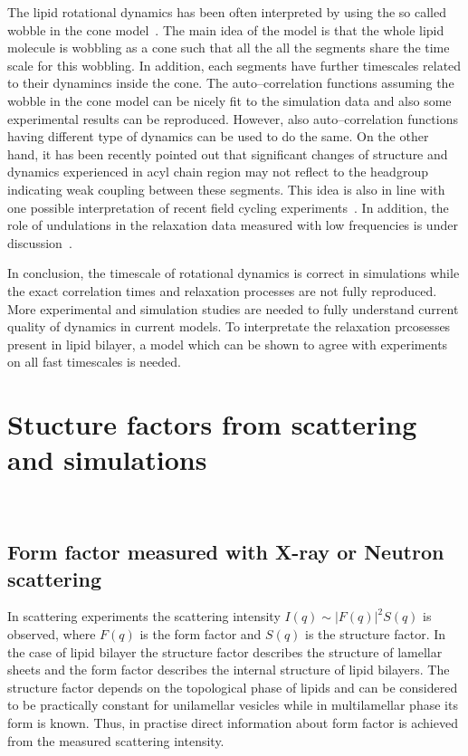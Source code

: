 \documentclass[aps,prl,superscriptaddress,twocolumn]{revtex4}
\begin{document}
The lipid rotational dynamics has been often interpreted by using the so called wobble in the cone model~\cite{pastor88,pastor02,klauda08a,klauda08c,sivanandam09}.
The main idea of the model is that the whole lipid molecule is wobbling as a cone such that all the
all the segments share the time scale for this wobbling. In addition, each segments have further timescales
related to their dynamincs inside the cone. The auto--correlation functions assuming the wobble in the cone
model can be nicely fit to the simulation data and also some experimental results can be reproduced. 
However, also auto--correlation functions having different type of dynamics can be used to do the same.
On the other hand, it has been recently pointed out that significant changes of structure and dynamics 
experienced in acyl chain region may not reflect to the headgroup~\cite{ferreiraTHESIS,botan15} indicating weak coupling 
between these segments. This idea is also in line with one possible interpretation of recent field cycling experiments~\cite{roberts09}.
In addition, the role of undulations in the relaxation data measured with low frequencies is under discussion~\cite{leftin11,edholm08,klauda08a,klauda08c}.

In conclusion, the timescale of rotational dynamics is correct in simulations while the exact correlation times
and relaxation processes are not fully reproduced. More experimental and simulation studies are needed 
to fully understand current quality of dynamics in current models. To interpretate the relaxation prcosesses
present in lipid bilayer, a model which can be shown to agree with experiments on all fast timescales is needed.




\newpage
\onecolumngrid

\section{Stucture factors from scattering and simulations}

 \\[0.1cm]

\subsection{Form factor measured with X-ray or Neutron scattering}

In scattering experiments the scattering intensity $I(q)\sim|F(q)|^2S(q)$ is observed,
where $F(q)$ is the form factor and $S(q)$ is the structure factor. In the case of lipid
bilayer the structure factor describes the structure of lamellar sheets and the form factor
describes the internal structure of lipid bilayers. The structure factor depends on the
topological phase of lipids and can be considered to be practically constant for unilamellar
vesicles while in multilamellar phase its form is known. Thus, in practise direct
information about form factor is achieved from the measured scattering intensity.
\end{document}
